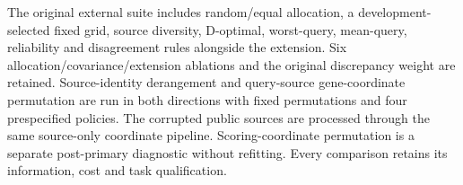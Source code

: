 The original external suite includes random/equal allocation, a development-selected fixed grid, source diversity, D-optimal, worst-query, mean-query, reliability and disagreement rules alongside the extension. Six allocation/covariance/extension ablations and the original discrepancy weight are retained. Source-identity derangement and query-source gene-coordinate permutation are run in both directions with fixed permutations and four prespecified policies. The corrupted public sources are processed through the same source-only coordinate pipeline. Scoring-coordinate permutation is a separate post-primary diagnostic without refitting. Every comparison retains its information, cost and task qualification.
